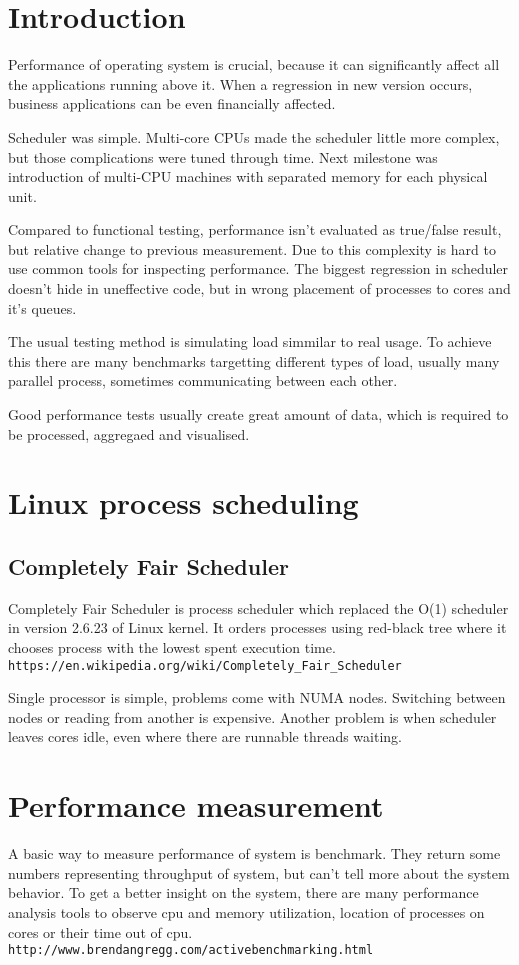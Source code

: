 \chapter{Introduction}
Performance of operating system is crucial, because it can significantly affect all the applications running above it.
When a regression in new version occurs, business applications can be even financially affected.

Scheduler was simple. Multi-core CPUs made the scheduler little more complex, but those complications were tuned through time.
Next milestone was introduction of multi-CPU machines with separated memory for each physical unit.

Compared to functional testing, performance isn't evaluated as true/false result, but relative change to previous measurement.
Due to this complexity is hard to use common tools for inspecting performance.
The biggest regression in scheduler doesn't hide in uneffective code, but in wrong placement of processes to cores and it's queues.

The usual testing method is simulating load simmilar to real usage.
To achieve this there are many benchmarks targetting different types of load, usually many parallel process, sometimes communicating between each other.

Good performance tests usually create great amount of data, which is required to be processed, aggregaed and visualised.

\chapter{Linux process scheduling}

\section{Completely Fair Scheduler}
Completely Fair Scheduler is process scheduler which replaced the O(1) scheduler
in version 2.6.23 of Linux kernel. It orders processes using red-black tree where it
chooses process with the lowest spent execution time.
\texttt{https://en.wikipedia.org/wiki/Completely\_Fair\_Scheduler}

Single processor is simple, problems come with NUMA nodes. Switching between
nodes or reading from another is expensive.
Another problem is when scheduler leaves cores idle, even where there are
runnable threads waiting.

\chapter{Performance measurement}
A basic way to measure performance of system is benchmark. They return some numbers representing throughput of system, but can't tell more about the system behavior.
To get a better insight on the system, there are many performance analysis tools to observe cpu and memory utilization, location of processes on cores or their time out of cpu.
\texttt{http://www.brendangregg.com/activebenchmarking.html}

